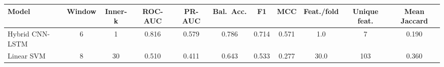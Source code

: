 \begin{tabular}{lcccccccccc}
\toprule
Model & Window & Inner-k & ROC-AUC & PR-AUC & Bal.\ Acc. & F1 & MCC & Feat./fold & Unique feat. & Mean Jaccard \\
\midrule
Hybrid CNN-LSTM & 6 & 1 & 0.816 & 0.579 & 0.786 & 0.714 & 0.571 & 1.0 & 7 & 0.190 \\
Linear SVM & 8 & 30 & 0.510 & 0.411 & 0.643 & 0.533 & 0.277 & 30.0 & 103 & 0.360 \\
\bottomrule
\end{tabular}
